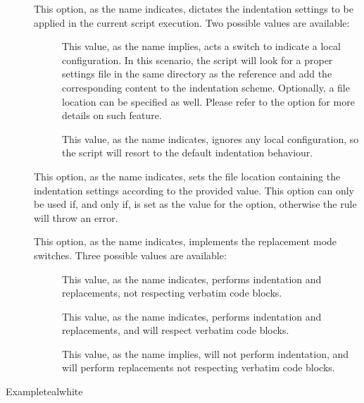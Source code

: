 \begin{description}
\begin{description}
\item[] This option, as the name indicates, dictates the indentation settings to be applied in the current script execution. Two possible values are available:

\begin{description}
\item[] This value, as the name implies, acts a switch to indicate a local configuration. In this scenario, the script will look for a proper settings file in the same directory as the  reference and add the corresponding content to the indentation scheme. Optionally, a file location can be specified as well. Please refer to the  option for more details on such feature.

\item[] This value, as the name indicates, ignores any local configuration, so the script will resort to the default indentation behaviour.
\end{description}

\item[] This option, as the name indicates, sets the file location containing the indentation settings according to the provided value. This option can only be used if, and only if,  is set as the value for the  option, otherwise the rule will throw an error.

\item[] This option, as the name indicates, implements the replacement mode switches. Three possible values are available:

\begin{description}
\item[] This value, as the name indicates, performs indentation and replacements, not respecting verbatim code blocks.

\item[] This value, as the name indicates, performs indentation and replacements, and will respect verbatim code blocks.

\item[] This value, as the name implies, will not perform indentation, and will perform replacements not respecting verbatim code blocks.
\end{description}
\end{description}

\begin{codebox}{Example}{teal}{\icnote}{white}
\end{codebox}


\end{description}

